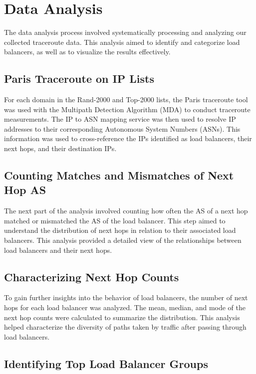 \documentclass[12pt]{cwru_thesis}
\begin{document}
\section{Data Analysis}

The data analysis process involved systematically processing and analyzing our collected traceroute data. This analysis aimed to identify and categorize load balancers, as well as to visualize the results effectively.

\subsection{Paris Traceroute on IP Lists}

For each domain in the Rand-2000 and Top-2000 lists, the Paris traceroute tool was used with the Multipath Detection Algorithm (MDA) to conduct traceroute measurements. The IP to ASN mapping service was then used to resolve IP addresses to their corresponding Autonomous System Numbers (ASNs). This information was used to cross-reference the IPs identified as load balancers, their next hops, and their destination IPs.

\subsection{Counting Matches and Mismatches of Next Hop AS}

The next part of the analysis involved counting how often the AS of a next hop matched or mismatched the AS of the load balancer. This step aimed to understand the distribution of next hops in relation to their associated load balancers. This analysis provided a detailed view of the relationships between load balancers and their next hops.

\subsection{Characterizing Next Hop Counts}

To gain further insights into the behavior of load balancers, the number of next hops for each load balancer was analyzed. The mean, median, and mode of the next hop counts were calculated to summarize the distribution. This analysis helped characterize the diversity of paths taken by traffic after passing through load balancers.

\subsection{Identifying Top Load Balancer Groups}
\end{document}
